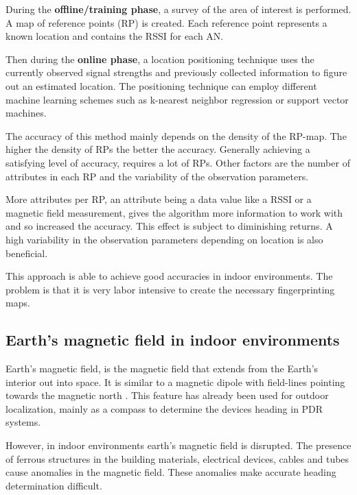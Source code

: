 During the \textbf{offline/training phase}, a survey of the area of interest is performed. A map of reference points (RP) is created. Each reference point represents a known location and contains the RSSI for each AN. 

Then during the \textbf{online phase}, a location positioning technique uses the currently observed signal strengths and previously collected information to figure out an estimated location. The positioning technique can employ different machine learning schemes such as k-nearest neighbor regression or support vector machines\cite{JoseMaster,surveyIndoorTechniques}. 

The accuracy of this method mainly depends on the density of the RP-map. The higher the density of RPs the better the accuracy. Generally achieving a satisfying level of accuracy, requires a lot of RPs. Other factors are the number of attributes in each RP and the variability of the observation parameters\cite{Li2012feasableMagnetic}.

More attributes per RP, an attribute being a data value like a RSSI or a magnetic field measurement, gives the algorithm more information to work with and so increased the accuracy\cite{Li2012feasableMagnetic}. This effect is subject to diminishing returns\cite{brouwers2014incremental}. A high variability in the observation parameters depending on location is also beneficial.

This approach is able to achieve good accuracies in indoor environments. The problem is that it is very labor intensive to create the necessary fingerprinting maps.

\subsection{Earth's magnetic field in indoor environments}

Earth's magnetic field, is the magnetic field that extends from the Earth's interior out into space. It is similar to a magnetic dipole with field-lines pointing towards the magnetic north \citep{EarthMagnetwikipedia}. This feature has already been used for outdoor localization, mainly as a compass to determine the devices heading in PDR systems.

However, in indoor environments earth's magnetic field is disrupted. The presence of ferrous structures in the building materials, electrical devices, cables and tubes cause anomalies in the magnetic field. These anomalies make accurate heading determination difficult\citep{afzal2010assessment}.

